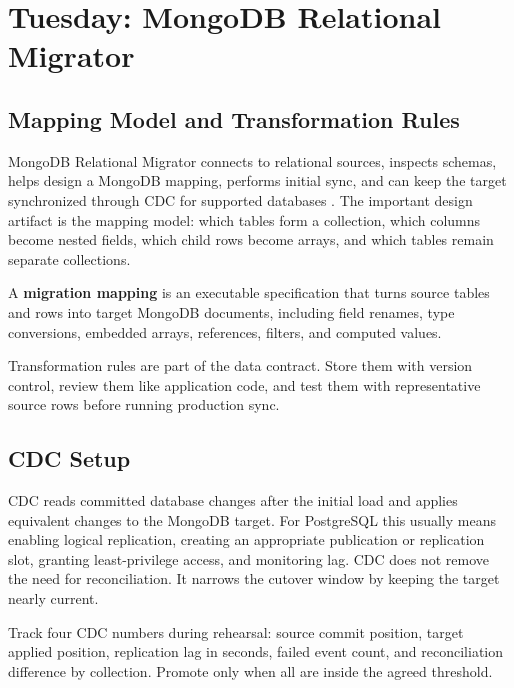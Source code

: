 \section{Tuesday: MongoDB Relational Migrator}
\subsection{Mapping Model and Transformation Rules}
MongoDB Relational Migrator connects to relational sources, inspects schemas, helps design a MongoDB mapping, performs initial sync, and can keep the target synchronized through CDC for supported databases \cite{mongodbRelationalMigratorDocs}. The important design artifact is the mapping model: which tables form a collection, which columns become nested fields, which child rows become arrays, and which tables remain separate collections.

\begin{definitionbox}
A \textbf{migration mapping} is an executable specification that turns source tables and rows into target MongoDB documents, including field renames, type conversions, embedded arrays, references, filters, and computed values.
\end{definitionbox}

\begin{notebox}
Transformation rules are part of the data contract. Store them with version control, review them like application code, and test them with representative source rows before running production sync.
\end{notebox}

\subsection{CDC Setup}
CDC reads committed database changes after the initial load and applies equivalent changes to the MongoDB target. For PostgreSQL this usually means enabling logical replication, creating an appropriate publication or replication slot, granting least-privilege access, and monitoring lag. CDC does not remove the need for reconciliation. It narrows the cutover window by keeping the target nearly current.

\begin{tipbox}
Track four CDC numbers during rehearsal: source commit position, target applied position, replication lag in seconds, failed event count, and reconciliation difference by collection. Promote only when all are inside the agreed threshold.
\end{tipbox}

